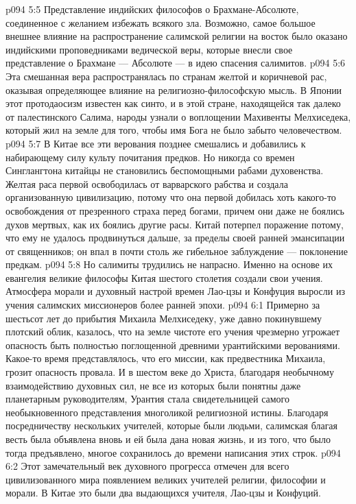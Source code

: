 \vs p094 5:5 \pc {}\bibnobreakspace Представление индийских философов о Брахмане\hyp{}Абсолюте, соединенное с желанием избежать всякого зла. Возможно, самое большое внешнее влияние на распространение салимской религии на восток было оказано индийскими проповедниками ведической веры, которые внесли свое представление о Брахмане --- Абсолюте --- в идею спасения салимитов.
\vs p094 5:6 \pc Эта смешанная вера распространялась по странам желтой и коричневой рас, оказывая определяющее влияние на религиозно\hyp{}философскую мысль. В Японии этот протодаосизм известен как синто, и в этой стране, находящейся так далеко от палестинского Салима, народы узнали о воплощении Махивенты Мелхиседека, который жил на земле для того, чтобы имя Бога не было забыто человечеством.
\vs p094 5:7 В Китае все эти верования позднее смешались и добавились к набирающему силу культу почитания предков. Но никогда со времен Синглангтона китайцы не становились беспомощными рабами духовенства. Желтая раса первой освободилась от варварского рабства и создала организованную цивилизацию, потому что она первой добилась хоть какого\hyp{}то освобождения от презренного страха перед богами, причем они даже не боялись духов мертвых, как их боялись другие расы. Китай потерпел поражение потому, что ему не удалось продвинуться дальше, за пределы своей ранней эмансипации от священников; он впал в почти столь же гибельное заблуждение --- поклонение предкам.
\vs p094 5:8 \pc Но салимиты трудились не напрасно. Именно на основе их евангелия великие философы Китая шестого столетия создали свои учения. Атмосфера морали и духовный настрой времен Лао\hyp{}цзы и Конфуция выросли из учения салимских миссионеров более ранней эпохи.
\vs p094 6:1 Примерно за шестьсот лет до прибытия Михаила Мелхиседеку, уже давно покинувшему плотский облик, казалось, что на земле чистоте его учения чрезмерно угрожает опасность быть полностью поглощенной древними урантийскими верованиями. Какое\hyp{}то время представлялось, что его миссии, как предвестника Михаила, грозит опасность провала. И в шестом веке до Христа, благодаря необычному взаимодействию духовных сил, не все из которых были понятны даже планетарным руководителям, Урантия стала свидетельницей самого необыкновенного представления многоликой религиозной истины. Благодаря посредничеству нескольких учителей, которые были людьми, салимская благая весть была объявлена вновь и ей была дана новая жизнь, и из того, что было тогда предъявлено, многое сохранилось до времени написания этих строк.
\vs p094 6:2 Этот замечательный век духовного прогресса отмечен для всего цивилизованного мира появлением великих учителей религии, философии и морали. В Китае это были два выдающихся учителя, Лао\hyp{}цзы и Конфуций.
